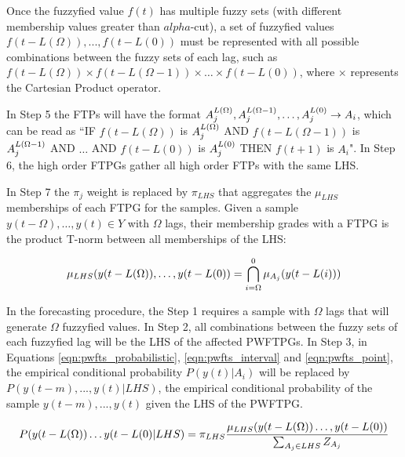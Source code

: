 Once the fuzzyfied value $f(t)$ has multiple fuzzy sets (with different membership values greater than $alpha$-cut), a set of fuzzyfied values $f(t-L(\Omega)),...,f(t-L(0))$ must be represented with all possible combinations between the fuzzy sets of each lag, such as $f(t-L(\Omega)) \times f(t - L(\Omega-1)) \times \ldots \times f(t-L(0))$, where $\times$ represents the Cartesian Product operator. 

In Step 5 the FTPs will have the format $A_j^{L(\Omega)}, A_j^{L(\Omega-1)},\ldots,A_j^{L(0)} \rightarrow A_i$, which can be read as ``IF $f(t-L(\Omega))$ is $A_j^{L(\Omega)}$ AND $f(t-L(\Omega-1))$ is $A_j^{L(\Omega-1)}$ AND $\dots$ AND $f(t-L(0))$ is $A_j^{L(0)}$ THEN $f(t+1)$ is $A_i$". In Step 6, the high order FTPGs gather all high order FTPs with the same LHS. 

In Step 7 the $\pi_j$ weight is replaced by $\pi_{LHS}$ that aggregates the $\mu_{LHS}$ memberships of each FTPG for the samples. Given a sample $y(t-\Omega),\dots,y(t) \in Y$ with $\Omega$ lags, their membership grades with a FTPG is the product T-norm between all memberships of the LHS: 

\begin{equation}
\displaystyle  \mu_{LHS}(y(t-L(\Omega)),\ldots,y(t-L(0)) = \bigcap_{i = \Omega}^0 \mu_{A_j}(y(t-L(i)))
\label{eqn:extension_highorder_mu}
\end{equation}

In the forecasting procedure, the Step 1 requires a sample with $\Omega$ lags that will generate $\Omega$ fuzzyfied values. In Step 2, all combinations between the fuzzy sets of each fuzzyfied lag will be the LHS of the affected PWFTPGs. In Step 3, in Equations \ref{eqn:pwfts_probabilistic}, \ref{eqn:pwfts_interval} and \ref{eqn:pwfts_point}, the empirical conditional probability $P(y(t)|A_i)$ will be replaced by $P(y(t-m),...,y(t) | LHS)$, the empirical conditional probability of the sample $y(t-m),...,y(t)$ given the LHS of the PWFTPG.

\begin{equation}
\displaystyle P(y(t-L(\Omega))\ldots y(t-L(0) | LHS) = \pi_{LHS} \frac{\mu_{LHS}(y(t-L(\Omega))\ldots,y(t-L(0))}{\sum_{A_j \in LHS} Z_{A_j}}
\label{eqn:extension_highorder}
\end{equation}



